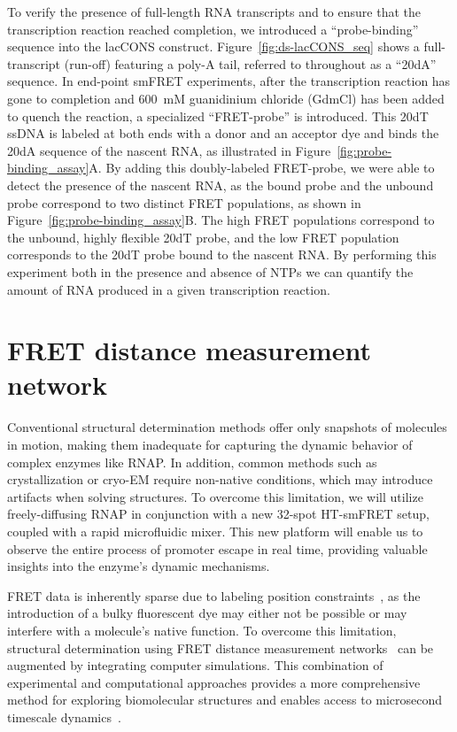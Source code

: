 To verify the presence of full-length RNA transcripts and to ensure that the transcription reaction reached completion, we introduced a \enquote{probe-binding} sequence into the \ac{lacCONS} construct.
Figure~\ref{fig:ds-lacCONS_seq} shows a full-transcript (run-off) featuring a poly-A tail, referred to throughout as a \enquote{20dA} sequence.
In end-point \ac{smFRET} experiments, after the transcription reaction has gone to completion and 600~mM guanidinium chloride (GdmCl) has been added to quench the reaction, a specialized \enquote{FRET-probe} is introduced.
This 20dT \ac{ssDNA} is labeled at both ends with a donor and an acceptor dye and binds the 20dA sequence of the nascent RNA, as illustrated in Figure~\ref{fig:probe-binding_assay}A.
By adding this doubly-labeled FRET-probe, we were able to detect the presence of the nascent RNA, as the bound probe and the unbound probe correspond to two distinct FRET populations, as shown in Figure~\ref{fig:probe-binding_assay}B. 
The high FRET populations correspond to the unbound, highly flexible 20dT probe, and the low FRET population corresponds to the 20dT probe bound to the nascent RNA.
By performing this experiment both in the presence and absence of \ac{NTP}s we can quantify the amount of RNA produced in a given transcription reaction. 

\section{FRET distance measurement network}
\label{sec:distance_network_exp}

Conventional structural determination methods offer only snapshots of molecules in motion, making them inadequate for capturing the dynamic behavior of complex enzymes like \ac{RNAP}.
In addition, common methods such as crystallization or cryo-EM require non-native conditions, which may introduce artifacts when solving structures. 
To overcome this limitation, we will utilize freely-diffusing \ac{RNAP} in conjunction with a new 32-spot \ac{HT-smFRET} setup, coupled with a rapid microfluidic mixer. 
This new platform will enable us to observe the entire process of promoter escape in real time, providing valuable insights into the enzyme's dynamic mechanisms.

FRET data is inherently sparse due to labeling position constraints~\cite{kalinin_NatMethods_2012, muschielok_NatMethods_2008}, as the introduction of a bulky fluorescent dye may either not be possible or may interfere with a molecule's native function. 
To overcome this limitation, structural determination using FRET distance measurement networks~\cite{hellenkamp_NatMethods_2017} can be augmented by integrating computer simulations.
This combination of experimental and computational approaches provides a more comprehensive method for exploring biomolecular structures and enables access to microsecond timescale dynamics~\cite{lerner_Science_2018, dimura_COSB_2016, kilic_NatComm_2018, dimura_NatComm_2020}.

